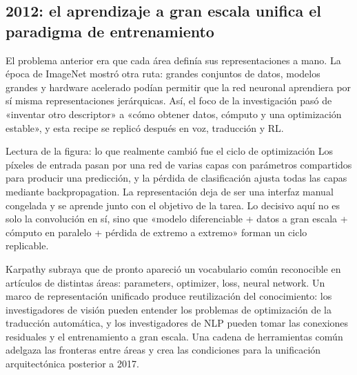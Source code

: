 \subsection{2012: el aprendizaje a gran escala unifica el paradigma de entrenamiento}

El problema anterior era que cada área definía sus representaciones a mano. La época de ImageNet mostró otra ruta: grandes conjuntos de datos, modelos grandes y hardware acelerado podían permitir que la red neuronal aprendiera por sí misma representaciones jerárquicas. Así, el foco de la investigación pasó de «inventar otro descriptor» a «cómo obtener datos, cómputo y una optimización estable», y esta recipe se replicó después en voz, traducción y RL.


\begin{knowledgebox}{Lectura de la figura: lo que realmente cambió fue el ciclo de optimización}
Los píxeles de entrada pasan por una red de varias capas con parámetros compartidos para producir una predicción, y la pérdida de clasificación ajusta todas las capas mediante backpropagation. La representación deja de ser una interfaz manual congelada y se aprende junto con el objetivo de la tarea. Lo decisivo aquí no es solo la convolución en sí, sino que «modelo diferenciable + datos a gran escala + cómputo en paralelo + pérdida de extremo a extremo» forman un ciclo replicable.
\end{knowledgebox}


Karpathy subraya que de pronto apareció un vocabulario común reconocible en artículos de distintas áreas: parameters, optimizer, loss, neural network. Un marco de representación unificado produce reutilización del conocimiento: los investigadores de visión pueden entender los problemas de optimización de la traducción automática, y los investigadores de NLP pueden tomar las conexiones residuales y el entrenamiento a gran escala. Una cadena de herramientas común adelgaza las fronteras entre áreas y crea las condiciones para la unificación arquitectónica posterior a 2017.

